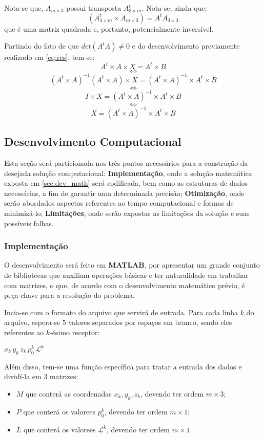	Nota-se que, $A_{m\times3}$ possui transposta $A_{3\times m}^t$. Nota-se, ainda que:
	$$(A^t_{3\times m} \times A_{m\times3}) = A^tA_{3\times3}$$
	que é uma matriz quadrada e, portanto, potencialmente inversível.

	Partindo do fato de que $det(A^tA) \neq 0$ e do desenvolvimento previamente realizado em \ref{eq:res},
	tem-se:
	\[A^t \times A \times X = A^t \times B\]
	$$\iff$$
	\[(A^t\times A)^{-1}(A^t \times A) \times X = (A^t\times A)^{-1} \times A^t \times B\]
	$$\iff$$
	\[I \times X = (A^t\times A)^{-1} \times A^t \times B\]
	$$\iff$$
	\begin{equation}\label{eq:final}X = (A^t\times A)^{-1} \times A^t \times B\end{equation}

	\subsection{Desenvolvimento Computacional}
	\label{sec:dev_comp}
	Esta seção será particionada nos três pontos necessários para a construção da desejada solução
	computacional: \textbf{Implementação}, onde a solução matemática exposta em \ref{sec:dev_math}
	será codificada, bem como as estruturas de dados necessárias, a fim de garantir uma determinada
	precisão; \textbf{Otimização}, onde serão abordados aspectos referentes ao tempo computacional
	e formas de minimizá-lo; \textbf{Limitações}, onde serão expostas as limitações da solução e suas
	possíveis falhas.
	\subsubsection{Implementação}
	\label{sec:imple}
	O desenvolvimento será feito em \textbf{MATLAB}, por apresentar um grande conjunto de bibliotecas
	que auxiliam operações básicas e ter naturalidade em trabalhar com matrizes, o que, de acordo com o
	desenvolvimento matemático prévio, é peça-chave para a resolução do problema.

	Incia-se com o formato do arquivo que servirá de entrada. Para cada linha $k$ do arquivo, espera-se
	$5$ valores separados por espaços em branco, sendo eles referentes ao $k$-ésimo receptor:

	$x_k\,y_k\,z_k\,p^k_0\,\mathcal{L}^k$

	Além disso, tem-se uma função específica para tratar a entrada dos dados e dividí-la em $3$ matrizes:
	\begin{itemize}
		\item $M$ que conterá as coordenadas $x_k, y_k, z_k$, devendo ter ordem $m\times3$;
		\item $P$ que conterá os valorees $p^k_0$, devendo ter ordem $m\times1$;
		\item $L$ que conterá os valorees $\mathcal{L}^k$, devendo ter ordem $m\times1$.
	\end{itemize}

